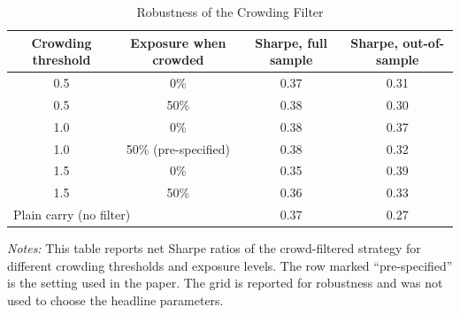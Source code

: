 \documentclass[11pt]{article}
\newcommand{\tabnote}[1]{\par\vspace{0.3em}\begin{minipage}{\linewidth}\footnotesize\setstretch{1.0}\textit{Notes:} #1\end{minipage}}
\begin{document}
\begin{table}[!htbp]
\centering
\caption{Robustness of the Crowding Filter}\label{tab:Arob}
\small
\begin{tabular}{cccc}
\toprule
Crowding threshold & Exposure when crowded & Sharpe, full sample & Sharpe, out-of-sample \\
\midrule
0.5 & 0\% & 0.37 & 0.31 \\
0.5 & 50\% & 0.38 & 0.30 \\
1.0 & 0\% & 0.38 & 0.37 \\
1.0 & 50\% (pre-specified) & 0.38 & 0.32 \\
1.5 & 0\% & 0.35 & 0.39 \\
1.5 & 50\% & 0.36 & 0.33 \\
\midrule
\multicolumn{2}{l}{Plain carry (no filter)} & 0.37 & 0.27 \\
\bottomrule
\end{tabular}
\tabnote{This table reports net Sharpe ratios of the crowd-filtered strategy for different crowding thresholds and exposure levels. The row marked ``pre-specified'' is the setting used in the paper. The grid is reported for robustness and was not used to choose the headline parameters.}
\end{table}
\end{document}
